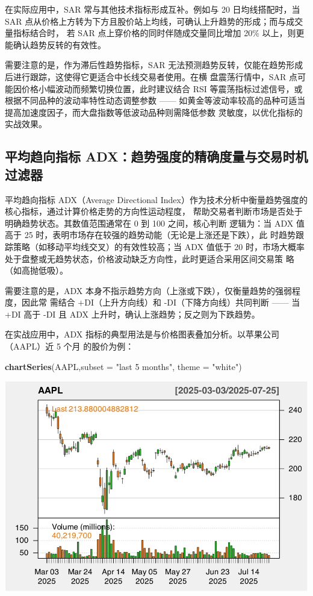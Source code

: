 \documentclass[]{ctexbook}
\newenvironment{Shaded}{\begin{snugshade}}{\end{snugshade}}
\newcommand{\AttributeTok}[1]{\textcolor[rgb]{0.13,0.29,0.53}{#1}}
\newcommand{\FunctionTok}[1]{\textcolor[rgb]{0.13,0.29,0.53}{\textbf{#1}}}
\newcommand{\NormalTok}[1]{#1}
\newcommand{\StringTok}[1]{\textcolor[rgb]{0.31,0.60,0.02}{#1}}
\begin{document}
在实际应用中，SAR 常与其他技术指标形成互补。例如与 20 日均线搭配时，当 SAR 点从价格上方转为下方且股价站上均线，可确认上升趋势的形成；而与成交量指标结合时，
若 SAR 点上穿价格的同时伴随成交量同比增加 20\% 以上，则更能确认趋势反转的有效性。

需要注意的是，作为滞后性趋势指标，SAR 无法预测趋势反转，仅能在趋势形成后进行跟踪，这使得它更适合中长线交易者使用。在横
盘震荡行情中，SAR 点可能因价格小幅波动而频繁切换位置，此时建议结合 RSI 等震荡指标过滤信号，或根据不同品种的波动率特性动态调整参数 ------ 如黄金等波动率较高的品种可适当提高加速度因子，而大盘指数等低波动品种则需降低参数
灵敏度，以优化指标的实战效果。

\subsection{平均趋向指标 ADX：趋势强度的精确度量与交易时机过滤器}\label{ux5e73ux5747ux8d8bux5411ux6307ux6807-adxux8d8bux52bfux5f3aux5ea6ux7684ux7cbeux786eux5ea6ux91cfux4e0eux4ea4ux6613ux65f6ux673aux8fc7ux6ee4ux5668}

平均趋向指标 ADX（Average Directional Index）作为技术分析中衡量趋势强度的核心指标，通过计算价格走势的方向性运动程度，
帮助交易者判断市场是否处于明确趋势状态。其数值范围通常在 0 到 100 之间，核心判断
逻辑为：当 ADX 值高于 25 时，表明市场存在较强的趋势动能（无论是上涨还是下跌），此
时趋势跟踪策略（如移动平均线交叉）的有效性较高；当 ADX 值低于 20 时，市场大概率处于盘整或无趋势状态，价格波动缺乏方向性，此时更适合采用区间交易策
略（如高抛低吸）。

需要注意的是，ADX 本身不指示趋势方向（上涨或下跌），仅衡量趋势的强弱程度，因此常
需结合 +DI（上升方向线）和 -DI（下降方向线）共同判断 ------ 当 +DI 高于 -DI 且 ADX 上升时，确认上涨趋势；反之则为下跌趋势。

在实战应用中，ADX 指标的典型用法是与价格图表叠加分析。以苹果公司（AAPL）近 5 个月
的股价为例：

\begin{Shaded}
\begin{Highlighting}[]
\FunctionTok{chartSeries}\NormalTok{(AAPL,}\AttributeTok{subset =} \StringTok{"last 5 months"}\NormalTok{, }\AttributeTok{theme =} \StringTok{"white"}\NormalTok{)}
\end{Highlighting}
\end{Shaded}

\includegraphics[width=0.9\linewidth]{QuantmodHandbook_files/figure-latex/adx-1}
\end{document}
